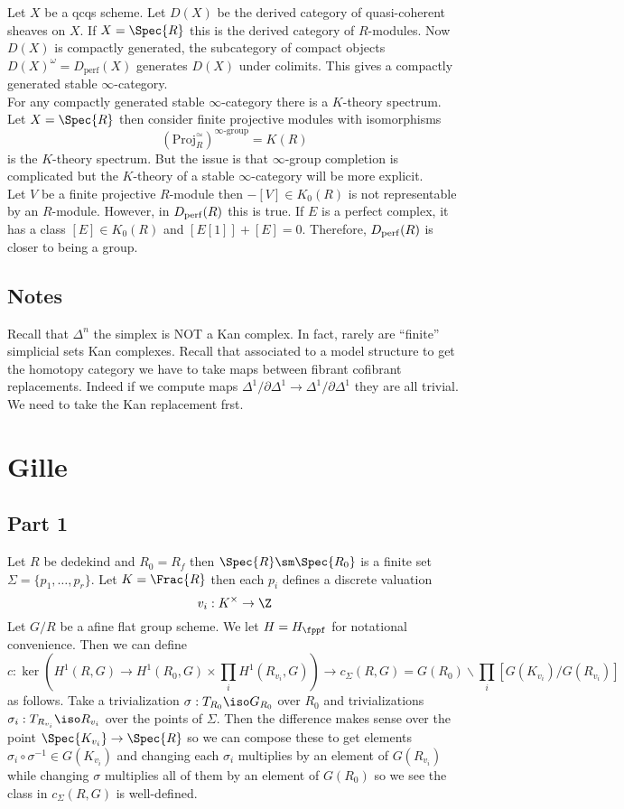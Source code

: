 \documentclass{article}
\begin{document}
Let $X$ be a qcqs scheme. Let $D(X)$ be the derived category of quasi-coherent sheaves on $X$. If $X = \Spec{R}$ this is the derived category of $R$-modules. Now $D(X)$ is compactly generated, the subcategory of compact objects $D(X)^\omega = D_{\text{perf}}(X)$ generates $D(X)$ under colimits.  This gives a compactly generated stable $\infty$-category. 
\bigskip\\
For any compactly generated stable $\infty$-category there is a $K$-theory spectrum. 
\bigskip\\
Let $X = \Spec{R}$ then consider finite projective modules with isomorphisms 
\[ \left( \text{Proj}_R^{\simeq} \right)^{\infty\text{-group}} = K(R) \]
is the $K$-theory spectrum. But the issue is that $\infty$-group completion is complicated but the $K$-theory of a stable $\infty$-category will be more explicit. 
\bigskip\\
Let $V$ be a finite projective $R$-module then $-[V] \in K_0(R)$ is not representable by an $R$-module. However, in $D_{\mathrm{perf}}(R)$ this is true. If $E$ is a perfect complex, it has a class $[E] \in K_0(R)$ and $[E[1]] + [E] = 0$. Therefore, $D_{\mathrm{perf}}(R)$ is closer to being a group. 


\subsection{Notes}

Recall that $\Delta^n$ the simplex is NOT a Kan complex. In fact, rarely are ``finite'' simplicial sets Kan complexes. Recall that associated to a model structure to get the homotopy category we have to take maps between fibrant cofibrant replacements. Indeed if we compute maps $\Delta^1 / \partial \Delta^1 \to \Delta^1 / \partial \Delta^1$ they are all trivial. We need to take the Kan replacement frst. 


\section{Gille}

\subsection{Part 1}

Let $R$ be dedekind and $R_0 = R_f$ then $\Spec{R} \sm \Spec{R_0}$ is a finite set $\Sigma = \{ p_1, \dots, p_r \}$. Let $K = \Frac{R}$ then each $p_i$ defines a discrete valuation
\[ v_i : K^\times \to \Z \]
Let $G / R$ be a afine flat group scheme. We let $H = H_{\fppf}$ for notational convenience. Then we can define
\[ c : \ker{ \left( H^1(R, G) \to H^1(R_0, G) \times \prod_i H^1(R_{v_i}, G) \right) } \to c_\Sigma(R, G) = G(R_0) \backslash \prod_i [G(K_{v_i}) / G(R_{v_i})] \]
as follows. Take a trivialization $\sigma : T_{R_0} \iso G_{R_0}$ over $R_0$ and trivializations $\sigma_i : T_{R_{v_i}} \iso R_{v_i}$ over the points of $\Sigma$. Then the difference makes sense over the point $\Spec{K_{v_i}} \to \Spec{R}$ so we can compose these to get elements $\sigma_i \circ \sigma^{-1} \in G(K_{v_i})$ and changing each $\sigma_i$ multiplies by an element of $G(R_{v_i})$ while changing $\sigma$ multiplies all of them by an element of $G(R_0)$ so we see the class in $c_{\Sigma}(R, G)$ is well-defined.
\end{document}
